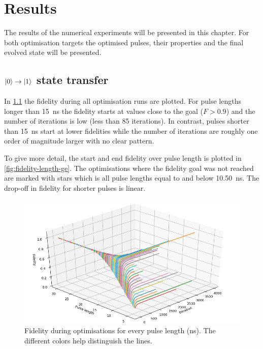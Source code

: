 \documentclass[main.tex]{subfiles}
\begin{document}
\chapter{Results}
The results of the numerical experiments will be presented in this chapter. For both optimisation targets the optimised pulses, their properties and the final evolved state will be presented.


\section{\texorpdfstring{\boldmath\(\ket{0}\rightarrow\ket{1}\)}{0 -> 1} state transfer}
In \cref{fig:3d-optim-ge} the fidelity during all optimisation runs are plotted.
For pulse lengths longer than \SI{15}{\nano\second} the fidelity starts at values close to the goal (\(F>0.9\)) and the number of iterations is low (less than 85 iterations).
In contrast, pulses shorter than \SI{15}{\nano\second} start at lower fidelities while the number of iterations are roughly one order of magnitude larger with no clear pattern.

To give more detail, the start and end fidelity over pulse length is plotted in \cref{fig:fidelity-length-ge}.
The optimisations where the fidelity goal was not reached are marked with stars which is all pulse lengths equal to and below \SI{10.50}{\nano\second}. The drop-off in fidelity for shorter pulses is linear.

\begin{figure}
    \centering
    \includegraphics[width=\linewidth]{figs/3d-optim-ge.png}
    \caption{Fidelity during optimisations for every pulse length (ns). The different colors help distinguish the lines.}
    \label{fig:3d-optim-ge}
\end{figure}

\end{document}

